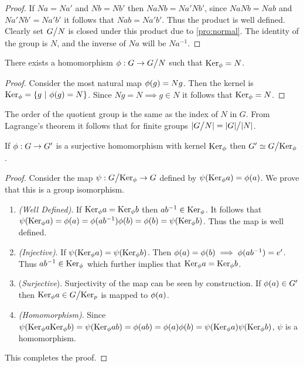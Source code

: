 \begin{proof}
  If $Na = Na'$ and $Nb=Nb'$ then $NaNb = Na'Nb'$, since $NaNb = Nab$ and $Na'Nb' = Na'b'$ it follows that $Nab = Na'b'$. Thus the product is well defined. Clearly set $G\bign/N$ is closed under this product due to \cref{pro:normal}. The identity of the group is $N$, and the inverse of $Na$ will be $Na^{-1}$.
\end{proof}
\begin{proposition}
  There exists a homomorphism $\p: G \to G\bign/N$ such that $\text{Ker}_\phi = N$.
\end{proposition}
\begin{proof}
  Consider the most natural map $\phi(g) = Ng$. Then the kernel is $\text{Ker}_\phi = \{g\ |\ \phi(g) = N\}$. Since $Ng = N \implies g \in N$ it follows that $\text{Ker}_\phi = N$.
\end{proof}
\begin{remark}
  The order of the quotient group is the same as the index of $N$ in $G$. From Lagrange's theorem it follows that for finite groups $|G\bign/N| = |G|\bign/ |N|$.
\end{remark}
\begin{theorem}\label{thm:1it}
  If $\phi:G\to G'$ is a surjective homomorphism with kernel $\text{Ker}_\phi$ then $G' \simeq G\bign/ \Ker_\p$.
\end{theorem}
\begin{proof}
  Consider the map $\psi: G\bign/ \Ker_\p \to G$ defined by $\psi(\text{Ker}_\phi a) = \phi(a)$. We prove that this is a group isomorphism.
  \begin{enumerate}
    \item \textit{(Well Defined)}. If $\text{Ker}_\phi a = \text{Ker}_\phi b$ then $ab^{-1} \in \text{Ker}_\phi$. It follows that $\psi(\text{Ker}_\phi a) = \phi(a) = \phi(ab^{-1})\phi(b) = \phi(b) = \psi(\text{Ker}_\phi b)$. Thus the map is well defined.
    \item \textit{(Injective)}. If $\psi(\text{Ker}_\phi a) = \psi(\text{Ker}_\phi b)$. Then $\phi(a) = \phi(b) \implies \phi(ab^{-1}) = e'$. Thus $ab^{-1} \in \text{Ker}_\phi$ which further implies that $\text{Ker}_\phi a = \text{Ker}_\phi b$.
    \item (\textit{Surjective}). Surjectivity of the map can be seen by construction. If $\phi(a)\in G'$ then $\Ker_\p a \in G\bign/ \Ker_p$ is mapped to $\phi(a)$. 
    \item \textit{(Homomorphism)}. Since $\psi(\text{Ker}_\phi a \text{Ker}_\phi b) = \psi(\text{Ker}_\phi ab) = \phi(ab) = \phi(a)\phi(b) = \psi(\text{Ker}_\phi a)\psi(\text{Ker}_\phi b)$, $\psi$ is a homomorphism.
  \end{enumerate}
  This completes the proof.
\end{proof}
